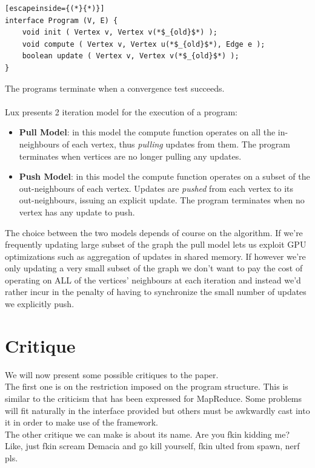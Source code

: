 \documentclass[]{article}
\begin{document}
\begin{lstlisting}[escapeinside={(*}{*)}]
interface Program (V, E) {
    void init ( Vertex v, Vertex v(*$_{old}$*) );
    void compute ( Vertex v, Vertex u(*$_{old}$*), Edge e );
    boolean update ( Vertex v, Vertex v(*$_{old}$*) );
}
\end{lstlisting}
The programs terminate when a convergence test succeeds.\\\\
Lux presents 2 iteration model for the execution of a program:
\begin{itemize}
	\item \textbf{Pull Model}: in this model the compute function operates on all the in-neighbours of each vertex, thus \textit{pulling} updates from them. The program terminates when vertices are no longer pulling any updates.
	\item \textbf{Push Model}: in this model the compute function operates on a subset of the out-neighbours of each vertex. Updates are \textit{pushed} from each vertex to its out-neighbours, issuing an explicit update. The program terminates when no vertex has any update to push.
\end{itemize}
The choice between the two models depends of course on the algorithm. If we're frequently updating large subset of the graph the pull model lets us exploit GPU optimizations such as aggregation of updates in shared memory. If however we're only updating a very small subset of the graph we don't want to pay the cost of operating on ALL of the vertices' neighbours at each iteration and instead we'd rather incur in the penalty of having to synchronize the small number of updates we explicitly push.

\section{Critique}
We will now present some possible critiques to the paper.\\
The first one is on the restriction imposed on the program structure. This is similar to the criticism that has been expressed for MapReduce. Some problems will fit naturally in the interface provided but others must be awkwardly cast into it in order to make use of the framework.\\

\noindent The other critique we can make is about its name. Are you fkin kidding me? Like, just fkin scream Demacia and go kill yourself, fkin ulted from spawn, nerf pls.
\end{document}
